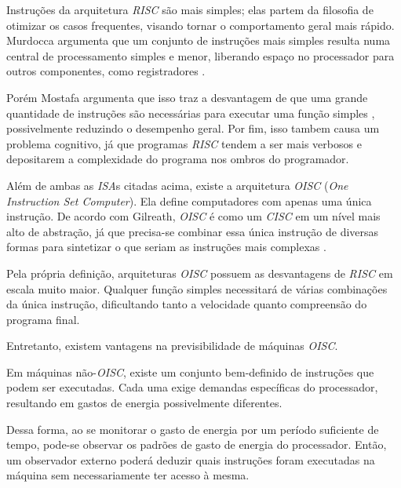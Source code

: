 Instruções da arquitetura \textit{RISC} são mais simples; elas partem da
filosofia de otimizar os casos frequentes, visando tornar o comportamento geral
mais rápido. Murdocca argumenta que um conjunto de instruções mais simples
resulta numa central de processamento simples e menor, liberando espaço no
processador para outros componentes, como registradores \cite{principles}.

Porém Mostafa argumenta que isso traz a desvantagem de que uma grande quantidade
de instruções são necessárias para executar uma função simples \cite{mostafa},
possivelmente reduzindo o desempenho geral. Por fim, isso tambem causa um
problema cognitivo, já que programas \textit{RISC} tendem a ser mais verbosos e
depositarem a complexidade do programa nos ombros do programador.

Além de ambas as \textit{ISA}s citadas acima, existe a arquitetura \textit{OISC}
(\textit{One Instruction Set Computer}). Ela define computadores com apenas uma
única instrução. De acordo com Gilreath, \textit{OISC} é como um \textit{CISC}
em um nível mais alto de abstração, já que precisa-se combinar essa única
instrução de diversas formas para sintetizar o que seriam as instruções mais
complexas \cite{minimalist}.


Pela própria definição, arquiteturas \textit{OISC} possuem as desvantagens de
\textit{RISC} em escala muito maior. Qualquer função simples necessitará de
várias combinações da única instrução, dificultando tanto a velocidade quanto
compreensão do programa final.

Entretanto, existem vantagens na previsibilidade de máquinas \textit{OISC}.


Em máquinas não-\textit{OISC}, existe um conjunto bem-definido de instruções que
podem ser executadas. Cada uma exige demandas específicas do processador,
resultando em gastos de energia possivelmente diferentes.

Dessa forma, ao se monitorar o gasto de energia por um período suficiente de
tempo, pode-se observar os padrões de gasto de energia do processador. Então, um
observador externo poderá deduzir quais instruções foram executadas na máquina
sem necessariamente ter acesso à mesma.

